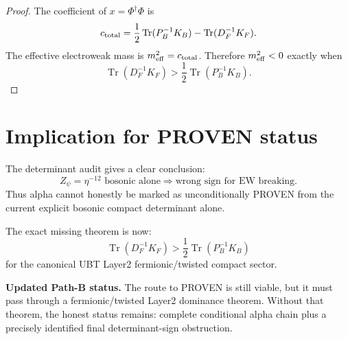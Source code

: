 \documentclass[12pt,a4paper]{article}
\begin{document}
\begin{proof}
The coefficient of $x=\Phi^\dagger\Phi$ is
\[
  c_{\rm total}
  =
  \frac12\operatorname{Tr}(P_B^{-1}K_B)
  -
  \operatorname{Tr}(D_F^{-1}K_F).
\]
The effective electroweak mass is $m_{\rm eff}^2=c_{\rm total}$.  Therefore
$m_{\rm eff}^2<0$ exactly when
\[
  \operatorname{Tr}(D_F^{-1}K_F)
  >
  \frac12\operatorname{Tr}(P_B^{-1}K_B).
\]
\end{proof}

\section{Implication for PROVEN status}

The determinant audit gives a clear conclusion:
\[
  Z_\psi=\eta^{-12}\text{ bosonic alone}
  \Longrightarrow
  \text{wrong sign for EW breaking.}
\]
Thus alpha cannot honestly be marked as unconditionally PROVEN from the current
explicit bosonic compact determinant alone.

The exact missing theorem is now:
\[
  \boxed{
  \operatorname{Tr}(D_F^{-1}K_F)
  >
  \frac12\operatorname{Tr}(P_B^{-1}K_B)
  }
\]
for the canonical UBT Layer2 fermionic/twisted compact sector.

\begin{resultbox}
\textbf{Updated Path-B status.} The route to PROVEN is still viable, but it must
pass through a fermionic/twisted Layer2 dominance theorem.  Without that theorem,
the honest status remains: complete conditional alpha chain plus a precisely
identified final determinant-sign obstruction.
\end{resultbox}

\ifdefined\INCLUDEMODE\else
\end{document}
